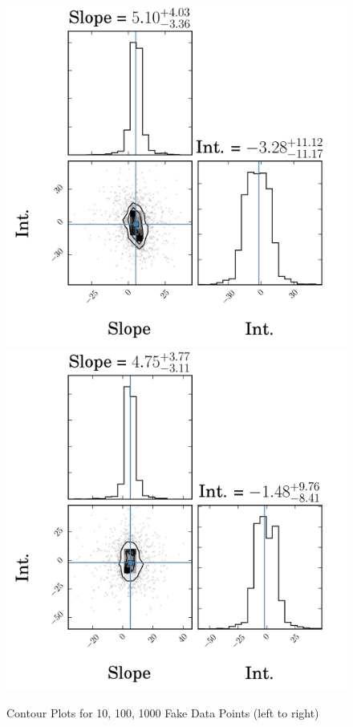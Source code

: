 \documentclass[english,12pt]{article}
\begin{document}
\begin{figure}[H]
\caption{Contour Plots for 10, 100, 1000 Fake Data Points (left to right)}
  \includegraphics[width=\linewidth]{corner_10_data_points.png}
\endminipage\hfill
{}
  \includegraphics[width=\linewidth]{corner_100_data_points.png}

\end{figure}
\end{document}
